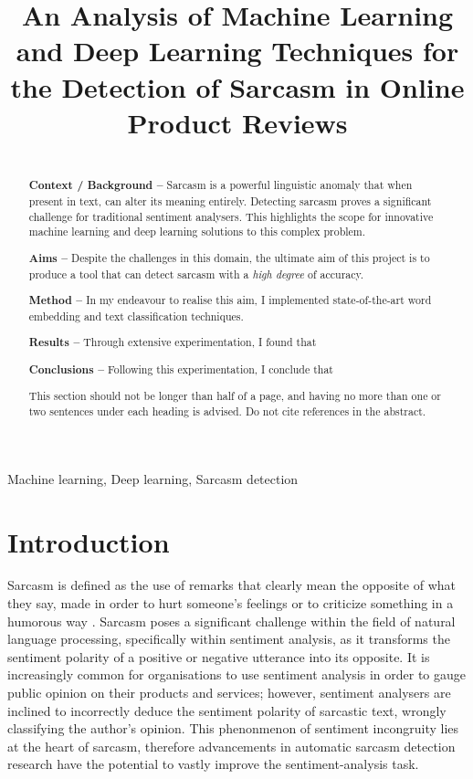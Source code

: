 \documentclass[12pt,a4paper]{article}
\title{An Analysis of Machine Learning and Deep Learning Techniques for the Detection of Sarcasm in Online Product Reviews}
\author{} %
\date{}
\begin{document}
\maketitle

\begin{abstract}
\\ \indent \textbf{Context / Background --} 
Sarcasm is a powerful linguistic anomaly that when present in text, can alter its meaning entirely. Detecting sarcasm proves a significant challenge for traditional sentiment analysers. This highlights the scope for innovative machine learning and deep learning solutions to this complex problem.

\indent \textbf{Aims --} Despite the challenges in this domain, the ultimate aim of this project is to produce a tool that can detect sarcasm with a \textit{high degree} of accuracy.

\indent \textbf{Method --} In my endeavour to realise this aim, I implemented state-of-the-art word embedding and text classification techniques.

\indent \textbf{Results --} Through extensive experimentation, I found that

\indent \textbf{Conclusions --} Following this experimentation, I conclude that

This section should not be longer than half of a page, and having no more than one or two sentences under each heading is advised. Do not cite references in the abstract.
\end{abstract}

\begin{keywords}
Machine learning, Deep learning, Sarcasm detection
\end{keywords}

\newpage

\section{Introduction}
\noindent Sarcasm is defined as the use of remarks that clearly mean the opposite of what they say, made in order to hurt someone's feelings or to criticize something in a humorous way \cite{cambridgesarcasm2019}. Sarcasm poses a significant challenge within the field of natural language processing, specifically within sentiment analysis, as it transforms the sentiment polarity of a positive or negative utterance into its opposite. It is increasingly common for organisations to use sentiment analysis in order to gauge public opinion on their products and services; however, sentiment analysers are inclined to incorrectly deduce the sentiment polarity of sarcastic text, wrongly classifying the author's opinion. This phenonmenon of sentiment incongruity lies at the heart of sarcasm, therefore advancements in automatic sarcasm detection research have the potential to vastly improve the sentiment-analysis task.\\
\end{document}
